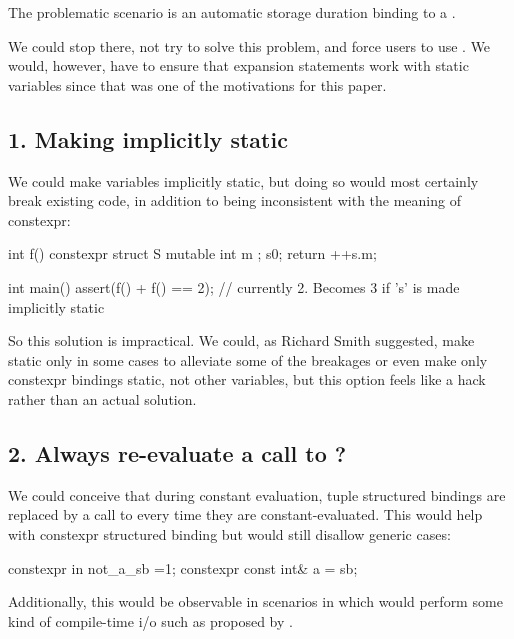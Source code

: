 \documentclass{wg21}
\begin{document}
The problematic scenario is an automatic storage duration binding to a .

We could stop there, not try to solve this problem, and force users to use .
We would, however, have to ensure that expansion statements work with static variables since that was one of the motivations for this paper.

\subsection{1. Making  implicitly static}

We could make  variables implicitly static, but  
doing so would most certainly break existing code, in addition to being inconsistent with the meaning of constexpr:

\begin{colorblock}
int f() {
    constexpr struct S {
        mutable int m ;
    } s{0};
    return ++s.m;
}

int main() {
    assert(f() + f() == 2); // currently 2. Becomes 3 if 's' is made implicitly static
}
\end{colorblock}

So this solution is impractical. We could, as Richard Smith suggested, %
make  static only in some cases to alleviate some of the breakages or even make only constexpr bindings static, not other variables, but this option 
feels like a hack rather than an actual solution.

\subsection{2. Always re-evaluate a call to ?}

We could conceive that during constant evaluation, tuple structured bindings are replaced by a call to  every time they are constant-evaluated.
This would help with constexpr structured binding but would still disallow generic cases:

\begin{colorblock}
constexpr in not_a_sb =1;
constexpr const int&  a = sb;
\end{colorblock}

Additionally, this would be observable in scenarios in which  would perform some kind of compile-time i/o such as proposed by .
\end{document}
